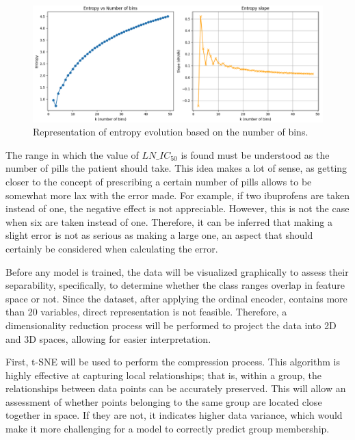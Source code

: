 \begin{figure}[H]
    \centering
    \includegraphics[width=1\textwidth]{figures/intervalEntropy.png}
    \caption{Representation of entropy evolution based on the number of bins.}
    \label{fig:intervalEntropy}
\end{figure}

The range in which the value of \(LN\_IC_{50}\) is found must be understood as the number of pills the patient should take. This idea makes a lot of sense, as getting closer to the concept of prescribing a certain number of pills allows to be somewhat more lax with the error made. For example, if two ibuprofens are taken instead of one, the negative effect is not appreciable. However, this is not the case when six are taken instead of one. Therefore, it can be inferred that making a slight error is not as serious as making a large one, an aspect that should certainly be considered when calculating the error.

Before any model is trained, the data will be visualized graphically to assess their separability, specifically, to determine whether the class ranges overlap in feature space or not. Since the dataset, after applying the ordinal encoder, contains more than 20 variables, direct representation is not feasible. Therefore, a dimensionality reduction process will be performed to project the data into 2D and 3D spaces, allowing for easier interpretation.

First, t-SNE \cite{cai2022theoreticalfoundationstsnevisualizing} will be used to perform the compression process. This algorithm is highly effective at capturing local relationships; that is, within a group, the relationships between data points can be accurately preserved. This will allow an assessment of whether points belonging to the same group are located close together in space. If they are not, it indicates higher data variance, which would make it more challenging for a model to correctly predict group membership.

